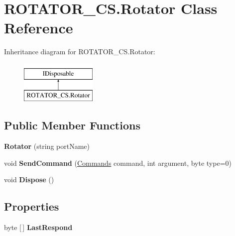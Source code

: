 \hypertarget{class_r_o_t_a_t_o_r___c_s_1_1_rotator}{}\section{R\+O\+T\+A\+T\+O\+R\+\_\+\+C\+S.\+Rotator Class Reference}
\label{class_r_o_t_a_t_o_r___c_s_1_1_rotator}
Inheritance diagram for R\+O\+T\+A\+T\+O\+R\+\_\+\+C\+S.\+Rotator\+:\begin{figure}[H]
\begin{center}
\leavevmode
\includegraphics[height=2.000000cm]{class_r_o_t_a_t_o_r___c_s_1_1_rotator}
\end{center}
\end{figure}
\subsection*{Public Member Functions}
\begin{DoxyCompactItemize}
\item 
\mbox{\label{class_r_o_t_a_t_o_r___c_s_1_1_rotator_a0f3dd9baa1c9e5974b0e97c8ef176f6d}} 
{\bfseries Rotator} (string port\+Name)
\item 
\mbox{\label{class_r_o_t_a_t_o_r___c_s_1_1_rotator_a3732640efe4cc4d84f556465c9896c66}} 
void {\bfseries Send\+Command} (\hyperlink{namespace_r_o_t_a_t_o_r___c_s_a6ca87d84e7d1c303da63cac59cf97209}{Commands} command, int argument, byte type=0)
\item 
\mbox{\label{class_r_o_t_a_t_o_r___c_s_1_1_rotator_afed6111c63c34050d177296ab68c5dd2}} 
void {\bfseries Dispose} ()
\end{DoxyCompactItemize}
\subsection*{Properties}
\begin{DoxyCompactItemize}
\item 
\mbox{\label{class_r_o_t_a_t_o_r___c_s_1_1_rotator_ac14567ec22bef3e3d59b8d25b2a7e208}} 
byte \mbox{[}$\,$\mbox{]} {\bfseries Last\+Respond}
\end{DoxyCompactItemize}
